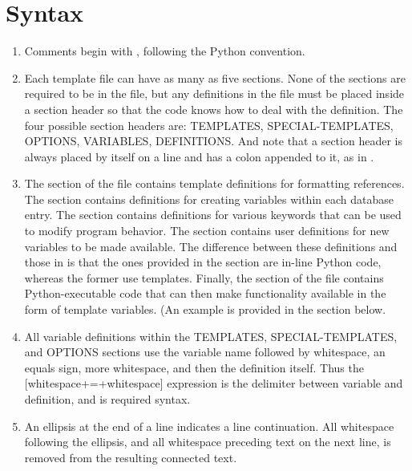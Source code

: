 \documentclass[letterpaper,10pt,english]{sphinxmanual}
\begin{document}
\section{Syntax}
\label{\detokenize{guidelines_for_writing_style_templates:syntax}}\begin{enumerate}
\item {} 
Comments begin with \sphinxcode{\sphinxupquote{\#}}, following the Python convention.

\item {} 
Each template file can have as many as five sections. None of the sections are required to be in the file, but any definitions in the file must be placed inside a section header so that the code knows how to deal with the definition. The four possible section headers are: TEMPLATES, SPECIAL-TEMPLATES, OPTIONS, VARIABLES, DEFINITIONS. And note that a section header is always placed by itself on a line and has a colon appended to it, as in .

\item {} 
The  section of the file contains template definitions for formatting references. The  section contains definitions for creating variables within each database entry. The  section contains definitions for various keywords that can be used to modify program behavior. The  section contains user definitions for new variables to be made available. The difference between these definitions and those in  is that the ones provided in the  section are in-line Python code, whereas the former use templates. Finally, the  section of the file contains Python-executable code that can then make functionality available in the form of template variables. (An example is provided in the  section below.

\item {} 
All variable definitions within the TEMPLATES, SPECIAL-TEMPLATES, and OPTIONS sections use the variable name followed by whitespace, an equals sign, more whitespace, and then the definition itself. Thus the {[}whitespace+=+whitespace{]} expression is the delimiter between variable and definition, and is required syntax.

\item {} 
An ellipsis  at the end of a line indicates a line continuation. All whitespace following the ellipsis, and all whitespace preceding text on the next line, is removed from the resulting connected text.


\end{enumerate}
\end{document}
